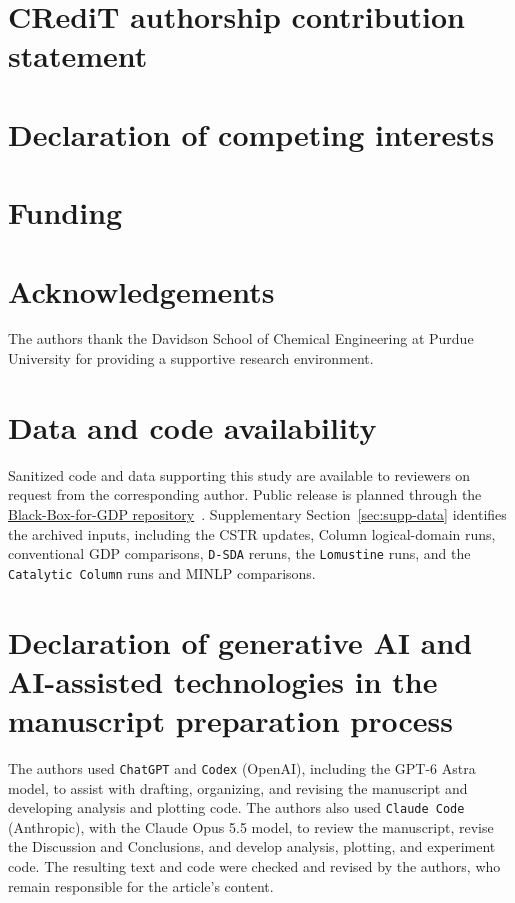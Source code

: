 \documentclass{article}
\begin{document}
\section*{CRediT authorship contribution statement}


\section*{Declaration of competing interests}


\section*{Funding}


\section*{Acknowledgements}
The authors thank the Davidson School of Chemical Engineering at Purdue University for providing a supportive research environment.

\section*{Data and code availability}
Sanitized code and data supporting this study are available to reviewers on request from the corresponding author.
Public release is planned through the \href{https://github.com/SECQUOIA/Black-Box-for-GDP/tree/ea65c5339486b576008df68645ea68d22f7c7213}{Black-Box-for-GDP repository}~\citep{rbfoptTestArchive}.
Supplementary Section~\ref{sec:supp-data} identifies the archived inputs, including the CSTR updates, Column logical-domain runs, conventional GDP comparisons, \texttt{D-SDA} reruns, the \texttt{Lomustine} runs, and the \texttt{Catalytic Column} runs and MINLP comparisons.

\section*{Declaration of generative AI and AI-assisted technologies in the manuscript preparation process}
The authors used \texttt{ChatGPT} and \texttt{Codex} (OpenAI), including the GPT-6 Astra model, to assist with drafting, organizing, and revising the manuscript and developing analysis and plotting code.
The authors also used \texttt{Claude Code} (Anthropic), with the Claude Opus 5.5 model, to review the manuscript, revise the Discussion and Conclusions, and develop analysis, plotting, and experiment code.
The resulting text and code were checked and revised by the authors, who remain responsible for the article's content.



\ifdefined\cacesubmission
\else
\def\manuscriptwithsupplement{1}

\fi
\end{document}
